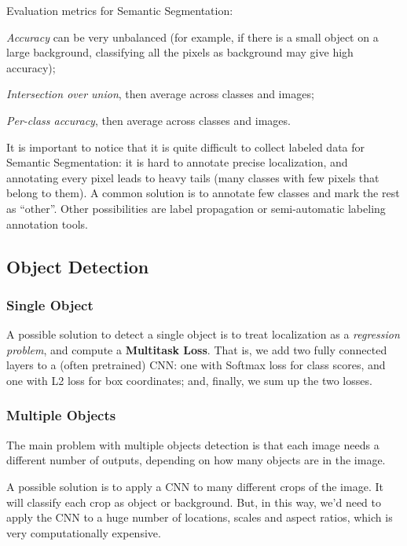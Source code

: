 Evaluation metrics for Semantic Segmentation:
\begin{myitem}
    \item \textit{Accuracy} can be very unbalanced (for example, if there is a small object on a large background, classifying all the pixels as background may give high accuracy);
    \item \textit{Intersection over union}, then average across classes and images;
    \item \textit{Per-class accuracy}, then average across classes and images.
\end{myitem}

It is important to notice that it is quite difficult to collect labeled data for Semantic Segmentation: it is hard to annotate precise localization, and annotating every pixel leads to heavy tails (many classes with few pixels that belong to them). A common solution is to annotate few classes and mark the rest as ``other''. Other possibilities are label propagation or semi-automatic labeling annotation tools.


\subsection{Object Detection}\label{sec:ds-detection}

\subsubsection{Single Object}\label{sec:ds-detection-single}

A possible solution to detect a single object is to treat localization as a \textit{regression problem}, and compute a \textbf{Multitask Loss}. That is, we add two fully connected layers to a (often pretrained) CNN: one with Softmax loss for class scores, and one with L2 loss for box coordinates; and, finally, we sum up the two losses.


\subsubsection{Multiple Objects}\label{sec:ds-detection-multiple}

The main problem with multiple objects detection is that each image needs a different number of outputs, depending on how many objects are in the image.

A possible solution is to apply a CNN to many different crops of the image. It will classify each crop as object or background. But, in this way, we'd need to apply the CNN to a huge number of locations, scales and aspect ratios, which is very computationally expensive.


